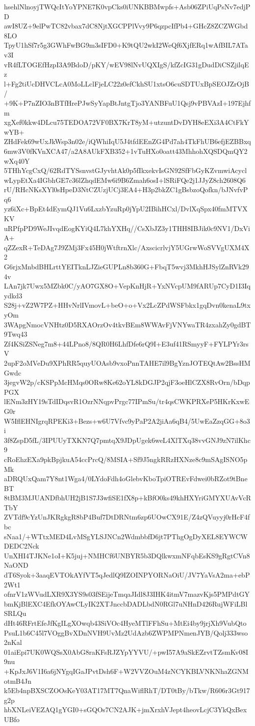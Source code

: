 hsehlNlnoyjTWQcItYoYPNE7K0vpCks0iUNKBBMwpfs+Asb06ZPiUqPsNv7edjPD
awI8UZ+9elPwTC82vbax7dC8NjtXGCPPlVvy9P6qzpcIfPb4+GHcZ8ZCZWGbd8LO
TpyU1hSf7r5g3GWhFwBG9m3sIFD0+K9tQU2wkI2WeQf6XjfERq1wAfBIL7ATav3I
vR4fLTOGEfHzpI3A9BdoD/pKY/wEV98lNvUQXIgS/kfZcIG31gDudDiCSZjilqEz
l+Fg2tiUcDHVCLcA0MoLLclFjeLC22z0efCkhSU1xtsO6cuSDTUxBpSEOJZrOjB/
+9K+P7nZIO3nBTfHrePJwSyYapBtJntgTjo3YANBFuU1Qsj9vPBVAzI+197Ejhfm
xgXef0kkw4DLcu75TEDOA72VF0BX7KrT8yM+utzuntDvDYH8eEXi3A4CtFkYwYB+
ZHdFek69wUxJkWsp3n02e/iQWhiIqU5J4tfdEEnZG4Pd7ah4TkFhUB6efjEZBBxq
6mw3V0fKVnXCA47/a2A8AUkFXB352+1vTuHXo0oatt43MhhohXQSDQmQY2wXq40Y
5THhYcgCxQ/62RdTYSsnvstGJyvhtAk0p5fIkxekvIsGN92SfFbGyKZvmwiAcycl
wLypEtXa4IGbhGE7c36lZhqdEMw6i9B6Zmah6osI+lSRiFQe2j1JJyZ8ch2608Q6
rU/RHcNKsXYl0sHpeD3NtCZUzjUCj3EA4+H3p2bkZC1gBsbzoQofkn/bJNvfvPq6
yz6iXc+BpEt4dEymQJ1Vu6LxzbYzuRp0jYpU2IBihHCxl/DvlXqSpx40fmMTVXKV
uRPfpPD9WeJIvqdEogKYiQ4L7khYXHq//CsXbJZ3y1THH8IBJik0c9NV1/DxViA+
qZZexR+TeDAg7J9ZMj3Fx45H0jWtftrnXlc/AxscicrlvjY5UGrwWoSVVgUXM4X2
G6rjxMnbdBHLrttYEITknLJZieGUPLn8b360G+FbqT5wvj3MkhHJSylZnRVk294v
LAn7jk7Uwx5MZbk0C/yAO7GX8O+VepKnHjR+YxNVcpUM9fARUp7CyD1I3Iqydkd3
S28j+vZ2W7PZ+HHvNrlIVmovL+beO+o+Vx2LcZPdWSFbkx1gqDvn0kenaL9txyOm
3WApgNmocVNHtz0D5RXAOrzOv4tkvBEm8WWAvFjVNYwaTR4zxahZy0gdBT9Twq43
Zf4KSiZSNeg7m8+44LPno8/8QR0H6LhfDfe6rQ9I+E3uf41RSmyyF+FYLPYr3rsV
2upF2oMVeDu9XPhRR5quyUOAsb9vxoPnnTAHE7il9BgYznJOTEQtAw2BssHMGwdc
3jegvW2p/cKSPpMcHMqs0ORw8Ke62oYL8kDGJP2qjF3oeHlCZX8RvOrn/bDqpPGX
lENm3zHY19sTdIDqsvR1OzrNNqpvPrgc77IPmSu/tr4qsCWKPRXeP5HKrKxwEG0r
W5IflEHNIgrqRPEKi3+Bezs+w6U7Vfvc9yPaP2A2jiAa6qB4/5UwEaZzqGG+8o3i
3f8ZspD5fL/3IPUUyTXKN7Q7pmtqX9JDpUgek6weL4XlTXq38vvGNJ9zN7ilKhc9
cRoEhzEXa9pkBpjkuA54ccPrcQ/8MSIA+Sf9J5ngkRRzHXNze8c9mSAgISNO5pMk
aDRQUxQam7Y8nt1Wga4/0LYdoFdh4oGlebvKboTpiOTREvFdwei0bRZot9tBneBT
8tBM3MJUANDfbhUH2jB1S7J3wfiSE1fX8p+kBfO0ks49khHXYriGMYXUAvVcRTbY
ZVTdf9cYzUnJKRgkgR8bP4Buf7DtDRNtm6zp6UOwCX91E/Z4zQVuyyj0rHcF4fbc
sNaa1/+WTtxMED4LvMSgYLSJNCn2WdmbbfD6jt7PThgOgDyXEL8EYWCWDEDC2Nck
UnXHI4TJKNe1oI+K5juj+NMHCf6UNBYR5b3DQlkwxmNFqbEsKS9gRgtCVn8NaOND
dT6Syok+3aaqEVTOkAYfVT5qJedlQ9IZOINPYORNaOiU/JV7YaVsA2ma+ebP2Wt1
ofnrV1zWVudLXR9X3YS9s03fSEijeTmqaJIdl8J3IHK4itmV7mazvKjs5PMPdtGY
bmKjBlEXC4EfkOYAwCLyIK2XTJnccbDADLbdN0RGl7uNHnD426RujWFiLBlSRLQu
dHt46RFrtEfeJfKgILgXOwqb43SiVOc4HyeMTlFFhSu+MtEi4by9jrjXh9VubQto
PsuL1b6C45l7VOggBvXDnNVH9UvMz2UdAzb6ZWPMPNmenJYB/Qolj333wso2nKal
01aiEpi7UK0WQSsX0AbG8raKFsRJZYpYYVU/+pwI57A9aSkEZrvtTZsmKv08I9nu
+KpJxJ6V1I6a6jNYgqIGaJPvtDsh6F+W2VVZOuM4zNCYKBLVNKNhaZGNMotmB4Jn
k5Eb4npBXSCZOOsKeY03AT17MT7QnaWiflRhT/DT0tBy/bTkw/R606r3Gt917g2p
hbXNLeiVEZAQ1gYGI0+sGQOs7CN2AJK+jmXrxhVJept4heovLcjC3YkQxBexUBfo
